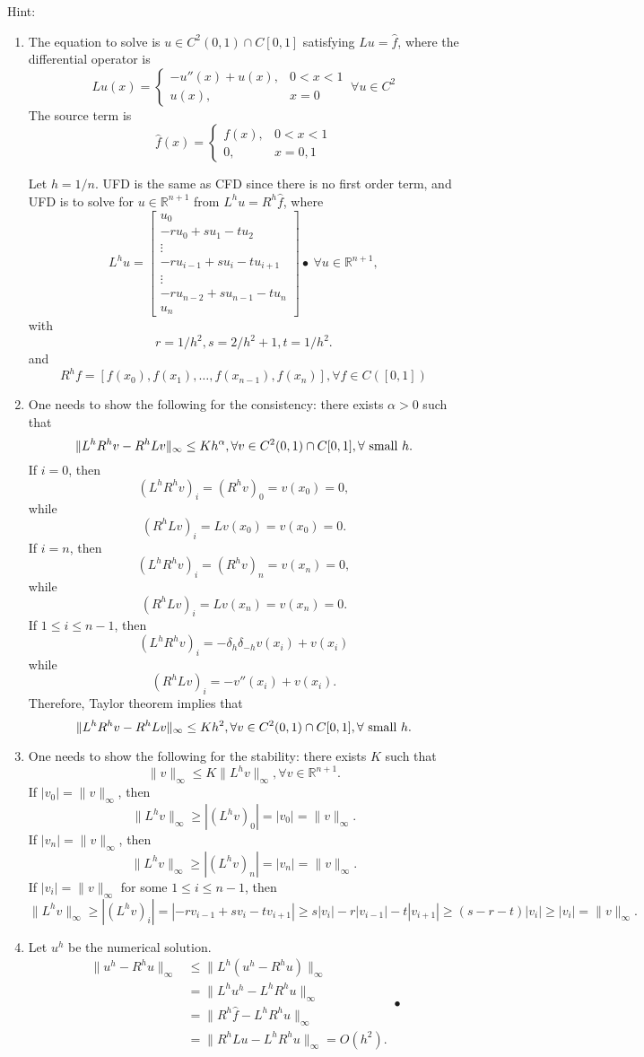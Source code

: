 \documentclass{article}
\begin{document}
Hint: 
\begin{enumerate}
\item The equation to solve is $u\in C^2(0,1) \cap C[0,1]$ satisfying $Lu = \hat f$, where
the differential operator is
$$ L u(x) = \left\{ 
\begin{array}
{ll}
- u''(x) + u(x), & 0<x<1\\
u(x), & x = 0
\end{array}
\right. 
\ \forall u \in C^2
$$
The source term is 
$$ \hat f (x) = \left\{
\begin{array}
{ll}
f(x), & 0<x<1\\
0, & x = 0,1
\end{array}
\right.
$$

Let $h = 1/n$. UFD is the same as CFD since there is no first order term, and UFD is to solve for $u\in \mathbb R^{n+1}$ from $L^h u = R^h \hat f$, where
$$L^h u = 
\begin{bmatrix}
u_0 \\
- r u_0 + s u_1 - t u_2\\
\vdots \\
-r u_{i-1} + s u_i - t u_{i+1}\\
\vdots\\
-r u_{n-2} + s u_{n-1} - t u_n\\
u_n
\end{bmatrix}•
\ \forall u\in \mathbb R^{n+1},
$$
with
$$r = 1/h^2, s = 2/h^2 +1, t = 1/h^2.$$
and
$$
R^h f = [ f(x_0),  f(x_1), \ldots, f(x_{n-1}), f(x_n)], \forall f\in C([0,1])
$$ 

\item One needs to show the following for the consistency: there exists $\alpha>0$ such that
$$\|L^h R^h v - R^h L v\|_\infty \le K h^\alpha, \forall v\in C^2(0,1) \cap C[0,1], \forall \hbox{ small } h.$$
If $i=0$, then
$$(L^h R^h v)_i = (R^h v)_0 = v(x_0) = 0,$$
while
$$(R^h L v)_i = L v(x_0) = v(x_0) = 0.$$
If $i=n$, then
$$(L^h R^h v)_i = (R^h v)_n = v(x_n) = 0,$$
while
$$(R^h L v)_i = L v(x_n) = v(x_n) = 0.$$
If $1\le i \le n-1$, then
$$(L^h R^h v)_i = - \delta_h\delta_{-h} v (x_i) + v(x_i)$$
while
$$
(R^h L v)_i = - v''(x_i) + v(x_i).$$
Therefore, Taylor theorem implies that
$$\|L^h R^h v - R^h L v\|_\infty \le K h^2, \forall v\in C^2(0,1) \cap C[0,1], \forall \hbox{ small } h.$$

\item One needs to show the following for the stability: there exists $K$ such that
$$\|v\|_\infty \le K \|L^h v\|_\infty, \forall v\in \mathbb R^{n+1}.$$
If $|v_0| = \|v\|_\infty$, then
$$\|L^h v\|_\infty \ge |(L^h v)_0| = |v_0| = \|v\|_\infty.$$
If $|v_n| = \|v\|_\infty$, then
$$\|L^h v\|_\infty \ge |(L^h v)_n| = |v_n| = \|v\|_\infty.$$
If $|v_i| = \|v\|_\infty$ for some $1\le i \le n-1$, then
$$\|L^h v\|_\infty \ge |(L^h v)_i| 
= |- r v_{i-1} + s v_i - t v_{i+1}|
\ge s|v_i| - r|v_{i-1}| - t|v_{i+1}|
\ge (s - r - t) |v_i| \ge |v_i| = \|v\|_\infty.$$

\item Let $u^h$ be the numerical solution.
$$
\begin{array}
{ll}
\|u^h - R^h u\|_\infty 
 & \le \|L^h (u^h - R^h u)\|_\infty \\
& = \|L^h u^h - L^h R^h u\|_\infty \\
 & = \|R^h \hat f - L^h R^h u\|_\infty\\
& = \|R^h L u - L^h R^h u\|_\infty = O(h^2).
\end{array}•
$$
\end{enumerate}
\end{document}
